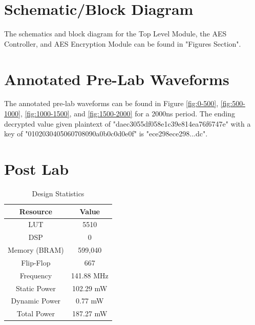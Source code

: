 \documentclass[journal, twocolumn, final,11pt,letterpaper]{IEEEtran}
\begin{document}
\section{Schematic/Block Diagram}
The schematics and block diagram for the Top Level Module, the AES Controller, and AES Encryption Module can be found in "Figures Section".

\section{Annotated Pre-Lab Waveforms}
The annotated pre-lab waveforms can be found in Figure \ref{fig:0-500}, \ref{fig:500-1000}, \ref{fig:1000-1500}, and \ref{fig:1500-2000} for a 2000ns period. The ending decrypted value given plaintext of "daec3055df058e1c39e814ea76f6747e" with a key of "0102030405060708090a0b0c0d0e0f" is "ece298ece298...dc".

\section{Post Lab}
\begin{table}[htbp]
	\centering
	\begin{tabular}{c|c}	%
		\toprule	%
		Resource & Value \\
		\midrule
		LUT & 5510\\
		DSP & 0\\
		Memory (BRAM) & 599,040\\
		Flip-Flop & 667\\
		Frequency &  141.88 MHz\\
		Static Power & 102.29 mW\\
		Dynamic Power & 0.77 mW\\
		Total Power & 187.27 mW\\
		\bottomrule	%
	\end{tabular}%
	\caption{Design Statistics}
	\label{tab:design}
\end{table}
\end{document}
